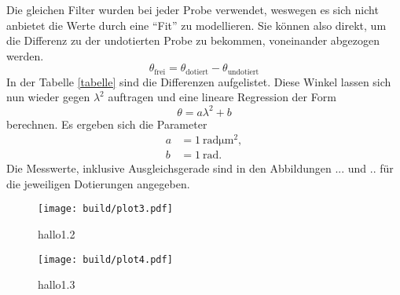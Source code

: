 Die gleichen Filter wurden bei jeder Probe verwendet, weswegen es sich nicht anbietet die Werte durch eine \enquote{Fit} zu modellieren.
Sie können also direkt, um die Differenz zu der undotierten Probe zu bekommen, voneinander abgezogen werden.
\begin{equation}
\theta_{\text{frei}} = \theta_{\text{dotiert}} - \theta_{\text{undotiert}}
\end{equation}
In der Tabelle \ref{tabelle} sind die Differenzen aufgelistet. Diese Winkel lassen sich nun wieder gegen $\lambda^2$ auftragen und eine lineare Regression
der Form
\begin{equation}
\theta = a \lambda^2 + b
\end{equation}
berechnen.
Es ergeben sich die Parameter 
\begin{align*}
a &= \SI{1}{\radian\micro\meter\squared},\\
b &= \SI{1}{\radian}.
\end{align*}
Die Messwerte, inklusive Ausgleichsgerade sind in den Abbildungen ... und .. für die jeweiligen Dotierungen angegeben.

\begin{figure}
    \centering
    \texttt{[image: build/plot3.pdf]}
    \caption{hallo1.2}
\end{figure}

\begin{figure}
    \centering
    \texttt{[image: build/plot4.pdf]}
    \caption{hallo1.3}
\end{figure}